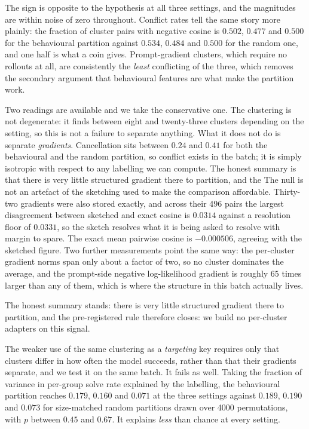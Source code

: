 The sign is opposite to the hypothesis at all three settings, and the magnitudes are within
noise of zero throughout. Conflict rates tell the same story more plainly: the fraction of
cluster pairs with negative cosine is $0.502$, $0.477$ and $0.500$ for the behavioural
partition against $0.534$, $0.484$ and $0.500$ for the random one, and one half is what a
coin gives. Prompt-gradient clusters, which require no rollouts at all, are consistently the
\emph{least} conflicting of the three, which removes the secondary argument that behavioural
features are what make the partition work.

Two readings are available and we take the conservative one. The clustering is not degenerate:
it finds between eight and twenty-three clusters depending on the setting, so this is not a
failure to separate anything. What it does not do is separate \emph{gradients}. Cancellation
sits between $0.24$ and $0.41$ for both the behavioural and the random partition, so conflict
exists in the batch; it is simply isotropic with respect to any labelling we can compute. The
honest summary is that there is very little structured gradient there to partition, and the
The null is not an artefact of the sketching used to make the comparison affordable. Thirty-two
gradients were also stored exactly, and across their 496 pairs the largest disagreement between
sketched and exact cosine is $0.0314$ against a resolution floor of $0.0331$, so the sketch
resolves what it is being asked to resolve with margin to spare. The exact mean pairwise cosine is
$-0.000506$, agreeing with the sketched figure. Two further measurements point the same way: the
per-cluster gradient norms span only about a factor of two, so no cluster dominates the average,
and the prompt-side negative log-likelihood gradient is roughly $65$ times larger than any of
them, which is where the structure in this batch actually lives.

The honest summary stands: there is very little structured gradient there to partition, and the
pre-registered rule therefore closes: we build no per-cluster adapters on this signal.

The weaker use of the same clustering as a \emph{targeting} key requires only that clusters
differ in how often the model succeeds, rather than that their gradients separate, and we test it
on the same batch. It fails as well. Taking the fraction of variance in per-group solve rate
explained by the labelling, the behavioural partition reaches $0.179$, $0.160$ and $0.071$ at the
three settings against $0.189$, $0.190$ and $0.073$ for size-matched random partitions drawn over
4000 permutations, with $p$ between $0.45$ and $0.67$. It explains \emph{less} than chance at every
setting.

